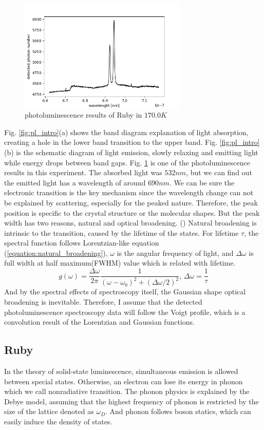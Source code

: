 \documentclass{article}
\begin{document}
 \begin{figure}[ht]
    \centering
    \includegraphics[width=8cm]{../results/Ruby(170.0)_raw_fig.png}
    \caption{photoluminescence results of Ruby in $170.0K$}
    \label{fig:pl_sample}
 \end{figure}
 Fig. \ref{fig:pl_intro}(a) shows the band diagram explanation of light absorption, creating a hole in the lower band transition to the upper band.
 Fig. \ref{fig:pl_intro}(b) is the schematic diagram of light emission, slowly relaxing and emitting light while energy drops between band gaps.
 Fig. \ref{fig:pl_sample} is one of the photoluminescence results in this experiment.
 The absorbed light was $532nm$, but we can find out the emitted light has a wavelength of around $690nm$.
 We can be sure the electronic transition is the key mechanism since the wavelength change can not be explained by scattering, especially for the peaked nature.
 Therefore, the peak position is specific to the crystal structure or the molecular shapes.
 But the peak width has two reasons, natural and optical broadening. (\cite{quantum_optics})
 Natural broadening is intrinsic to the transition, caused by the lifetime of the states.
 For lifetime $\tau$, the spectral function follows Lorentzian-like equation (\ref{equation:natural_broadening}), $\omega$ is the angular frequency of light, and $\Delta \omega$ is full width at half maximum(FWHM) value which is related with lifetime.
 \begin{equation}
   g(\omega) = \frac{\Delta \omega}{2 \pi} \frac{1}{(\omega-\omega_0)^2 + (\Delta \omega/2)^2},\, \Delta \omega = \frac{1}{\tau}
   \label{equation:natural_broadening}
 \end{equation}
 And by the spectral effects of spectroscopy itself, the Gaussian shape optical broadening is inevitable.
 Therefore, I assume that the detected photoluminescence spectroscopy data will follow the Voigt profile, which is a convolution result of the Lorentzian and Gaussian functions.


 \subsection{Ruby}
 \label{intro:ruby}
 In the theory of solid-state luminescence, simultaneous emission is allowed between special states.
 Otherwise, an electron can lose its energy in phonon which we call nonradiative transition.
 The phonon physics is explained by the Debye model, assuming that the highest frequency of phonon is restricted by the size of the lattice denoted as $\omega_D$.
 And phonon follows boson statics, which can easily induce the density of states.
 
\end{document}
